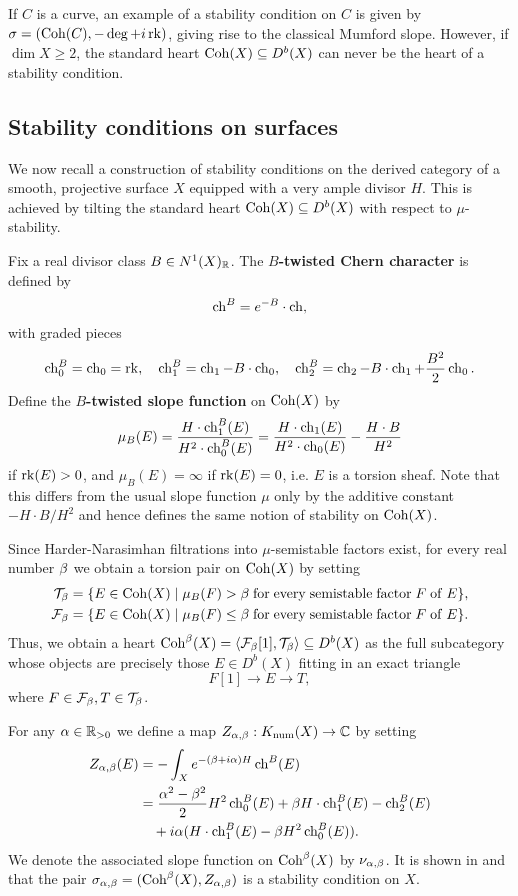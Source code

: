 If $C$ is a curve, an example of a stability condition on $C$ is given by $\sigma = (\operatorname{\mathrm{Coh}}(C), -\deg + i \operatorname{\mathrm{rk}})$, giving rise to the classical Mumford slope. However, if $\dim X \ge 2$, the standard heart $\operatorname{\mathrm{Coh}}(X) \subseteq D^b(X)$ can never be the heart of a stability condition. 


\subsection{Stability conditions on surfaces}\label{section:stabcondsurf}
We now recall a construction of stability conditions on the derived category of a smooth, projective surface $X$ equipped with a very ample divisor $H$. This is achieved by tilting the standard heart $\operatorname{\mathrm{Coh}}(X) \subseteq D^b(X)$ with respect to $\mu$-stability. 

Fix a real divisor class $B \in N^1(X)_{\mathbb{R}}$. The {\bf $B$-twisted Chern character} is defined by
\[ \operatorname{\mathrm{ch}}^B = e^{-B}\cdot \operatorname{\mathrm{ch}}, \]
with graded pieces
\[ \operatorname{\mathrm{ch}}^B_0 = \operatorname{\mathrm{ch}}_0 = \operatorname{\mathrm{rk}}, \quad \operatorname{\mathrm{ch}}^B_1 = \operatorname{\mathrm{ch}}_1 - B \cdot \operatorname{\mathrm{ch}}_0, \quad \operatorname{\mathrm{ch}}^B_2 = \operatorname{\mathrm{ch}}_2 - B \cdot \operatorname{\mathrm{ch}}_1 + \frac{B^2}{2} \operatorname{\mathrm{ch}}_0. \]
Define the {\bf $B$-twisted slope function} on $\operatorname{\mathrm{Coh}}(X)$ by
\[ \mu_B(E) = \frac{H \cdot \operatorname{\mathrm{ch}}^B_1(E)}{H^2 \cdot \operatorname{\mathrm{ch}}^B_0(E)} = \frac{H \cdot \operatorname{\mathrm{ch}}_1(E)}{H^2 \cdot \operatorname{\mathrm{ch}}_0(E)} - \frac{H \cdot B}{H^2} \]
if $\operatorname{\mathrm{rk}}(E) > 0$, and $\mu_B(E) = \infty$ if $\operatorname{\mathrm{rk}}(E) = 0$, i.e. $E$ is a torsion sheaf. Note that this differs from the usual slope function $\mu$ only by the additive constant $-H\cdot B/H^2$ and hence defines the same notion of stability on $\operatorname{\mathrm{Coh}}(X)$. 

Since Harder-Narasimhan filtrations into $\mu$-semistable factors exist, for every real number $\beta$ we obtain a torsion pair on $\operatorname{\mathrm{Coh}}(X)$ by setting
\begin{align*}
    \mathcal{T}_\beta & = \{ E \in \operatorname{\mathrm{Coh}}(X) \;|\; \mu_B(F) > \beta \mathrm{\;for\;every\;semistable\;factor\;} F \mathrm{\;of\;} E \}, \\
    \mathcal{F}_\beta & = \{ E \in \operatorname{\mathrm{Coh}}(X) \;|\; \mu_B(F) \le \beta \mathrm{\;for\;every\;semistable\;factor\;} F \mathrm{\;of\;} E \}.
\end{align*}
Thus, we obtain a heart $\operatorname{\mathrm{Coh}}^\beta(X) = \langle \mathcal{F}_\beta[1], \mathcal{T}_\beta \rangle \subseteq D^b(X)$ as the full subcategory whose objects are precisely those $E \in D^b(X)$ fitting in an exact triangle
\[ F[1] \to E \to T, \]
where $F \in \mathcal{F}_\beta, T \in \mathcal{T}_\beta$. 

For any $\alpha \in \mathbb{R}_{>0}$ we define a map $Z_{\alpha,\beta}: K_{\mathrm{num}}(X) \to \mathbb{C}$ by setting
\begin{align*}
    Z_{\alpha, \beta}(E) & = -\int_X e^{-(\beta + i \alpha)H} \operatorname{\mathrm{ch}}^B(E) \\
    & = \frac{\alpha^2 - \beta^2}{2} H^2 \operatorname{\mathrm{ch}}^B_0(E) + \beta H\cdot\operatorname{\mathrm{ch}}^B_1(E) - \operatorname{\mathrm{ch}}^B_2(E) \\
    & \quad  + i\alpha(H \cdot \operatorname{\mathrm{ch}}^B_1(E) - \beta H^2 \operatorname{\mathrm{ch}}^B_0(E)).
\end{align*}
We denote the associated slope function on $\operatorname{\mathrm{Coh}}^\beta(X)$ by $\nu_{\alpha,\beta}$. It is shown in \cite{bridgelandK3} and \cite{ABL13} that the pair $\sigma_{\alpha,\beta} = (\operatorname{\mathrm{Coh}}^\beta(X), Z_{\alpha,\beta})$ is a stability condition on $X$. 


